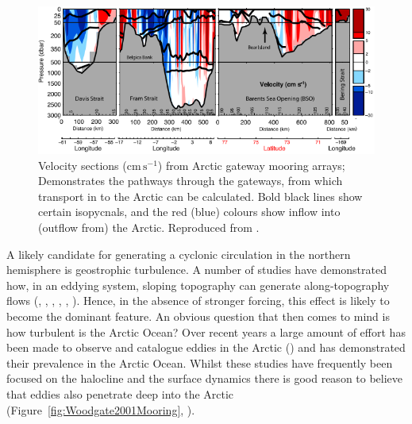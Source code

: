 \documentclass[12pt,a4paper]{report}
\newcommand*\figref[1]{Figure~\ref{#1}}
\begin{document}
\begin{figure}
	\centering
	\includegraphics[width=\linewidth]{Tsubouchi2012Transport}
	\caption[Adapted from \cite{tsubouchi2012arctic}]{Velocity
		sections ($\mathrm{cm}\, \mathrm{s}^{-1}$) from Arctic gateway mooring arrays;
		Demonstrates the pathways through the gateways, from which transport 
		in to the Arctic can be calculated.
		Bold black lines show certain isopycnals, and the red (blue) colours show inflow
		into (outflow from) the Arctic. Reproduced from \cite{tsubouchi2012arctic}.}
	\label{fig:Tsubouchi2012Transport}
\end{figure}

A likely candidate for generating a cyclonic circulation in the northern hemisphere is
geostrophic turbulence. A number of studies have demonstrated how, in an eddying system, 
sloping topography can generate along-topography flows (\cite{bretherton1976two},  \cite{rhines1982homogenization},
\cite{treguier1989topographically}, \cite{salmon1998lectures}, \cite{adcock2000interactions}, \cite{nost2008asymmetry}). Hence, in the absence of stronger
forcing, this effect is likely to become the dominant feature. An obvious question that then
comes to mind is how turbulent is the Arctic Ocean? Over recent years a large amount  of 
effort has been made to observe and catalogue eddies in the Arctic
(\cite{zhao2014characterizing}) and has demonstrated their prevalence in the Arctic Ocean.
Whilst these studies have frequently been focused on the halocline and the surface dynamics
there is good reason to believe that eddies also penetrate deep into the Arctic 
(\figref{fig:Woodgate2001Mooring}, \cite{woodgate2001arctic}).
\end{document}
